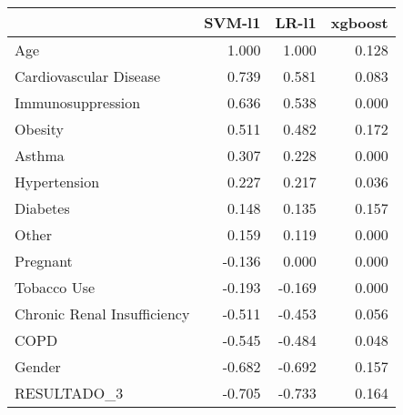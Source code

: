 \begin{tabular}{lrrr}
\toprule
{} &  SVM-l1 &  LR-l1 &  xgboost \\
\midrule
Age                         &   1.000 &  1.000 &    0.128 \\
Cardiovascular Disease      &   0.739 &  0.581 &    0.083 \\
Immunosuppression           &   0.636 &  0.538 &    0.000 \\
Obesity                     &   0.511 &  0.482 &    0.172 \\
Asthma                      &   0.307 &  0.228 &    0.000 \\
Hypertension                &   0.227 &  0.217 &    0.036 \\
Diabetes                    &   0.148 &  0.135 &    0.157 \\
Other                       &   0.159 &  0.119 &    0.000 \\
Pregnant                    &  -0.136 &  0.000 &    0.000 \\
Tobacco Use                 &  -0.193 & -0.169 &    0.000 \\
Chronic Renal Insufficiency &  -0.511 & -0.453 &    0.056 \\
COPD                        &  -0.545 & -0.484 &    0.048 \\
Gender                      &  -0.682 & -0.692 &    0.157 \\
RESULTADO\_3                 &  -0.705 & -0.733 &    0.164 \\
\bottomrule
\end{tabular}
